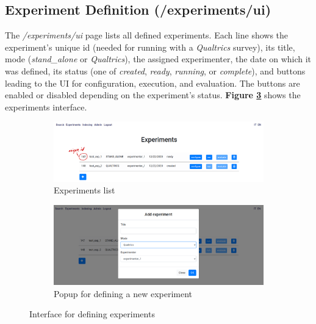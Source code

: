 \documentclass[a4paper]{usiinfbachelorproject}
\begin{document}
\begin{appendices}
        \newpage


        \subsection{Experiment Definition \small{(/experiments/ui)}}

        The \emph{/experiments/ui} page lists all defined experiments. Each line shows the experiment's unique id (needed for running
        with a \emph{Qualtrics} survey), its title, mode (\emph{stand\_alone} or \emph{Qualtrics}), the assigned experimenter, the date on which it was defined, 
        its status (one of \emph{created}, \emph{ready}, \emph{running}, or \emph{complete}), and buttons leading to the UI for configuration,
        execution, and evaluation. The buttons are enabled or disabled depending on the experiment's status. \textbf{Figure \ref{fig:experimentsUi}}
        shows the experiments interface.

        \begin{figure} [h]
             \centering
             \begin{subfigure}[b]{0.8\textwidth}
                 \centering
                 \includegraphics[width=\textwidth]{figures/experiments_1}
                 \caption{Experiments list}
                 \label{fig:experimentsUi1}
             \end{subfigure}
             \par\bigskip
             \begin{subfigure}[b]{0.8\textwidth}
                 \centering
                 \includegraphics[width=\textwidth]{figures/experiments_2}
                 \caption{Popup for defining a new experiment}
                 \label{fig:experimentsUi2}
             \end{subfigure}
             \caption[]{Interface for defining experiments}
             \label{fig:experimentsUi}
        \end{figure}



\end{appendices}
\end{document}
